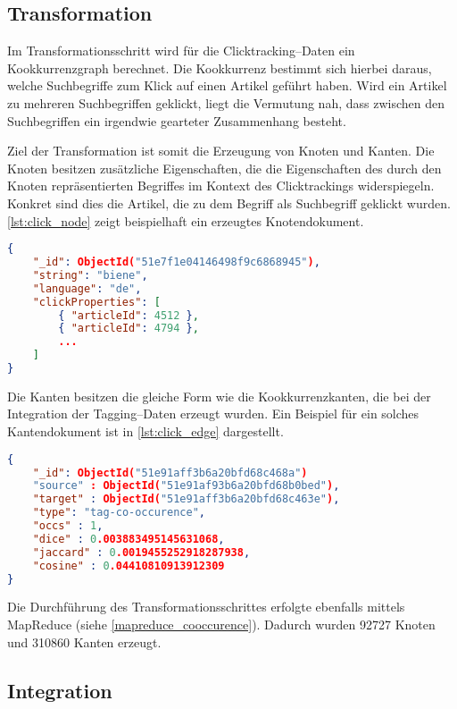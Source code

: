 \subsection{Transformation}

Im Transformationsschritt wird für die Clicktracking--Daten ein Kookkurrenzgraph berechnet. Die Kookkurrenz bestimmt sich hierbei daraus, welche Suchbegriffe zum Klick auf einen Artikel geführt haben. Wird ein Artikel zu mehreren Suchbegriffen geklickt, liegt die Vermutung nah, dass zwischen den Suchbegriffen ein irgendwie gearteter Zusammenhang besteht.

Ziel der Transformation ist somit die Erzeugung von Knoten und Kanten. Die Knoten besitzen zusätzliche Eigenschaften, die die Eigenschaften des durch den Knoten repräsentierten Begriffes im Kontext des Clicktrackings widerspiegeln. Konkret sind dies die Artikel, die zu dem Begriff als Suchbegriff geklickt wurden. \cref{lst:click_node} zeigt beispielhaft ein erzeugtes Knotendokument.

\begin{lstlisting}[language=json, label={lst:click_node}, caption={Knotendokument mit Clicktracking--Eigenschaften}]
{
    "_id": ObjectId("51e7f1e04146498f9c6868945"),
    "string": "biene",
    "language": "de",
    "clickProperties": [
        { "articleId": 4512 },
        { "articleId": 4794 },
        ...
    ]
}
\end{lstlisting}

Die Kanten besitzen die gleiche Form wie die Kookkurrenzkanten, die bei der Integration der Tagging--Daten erzeugt wurden. Ein Beispiel für ein solches Kantendokument ist in \cref{lst:click_edge} dargestellt.

\begin{lstlisting}[language=json, label={lst:click_edge}, caption={Clicktracking--Kookkurrenzkante}]
{
    "_id": ObjectId("51e91aff3b6a20bfd68c468a")
    "source" : ObjectId("51e91af93b6a20bfd68b0bed"),
    "target" : ObjectId("51e91aff3b6a20bfd68c463e"),
    "type": "tag-co-occurence",
    "occs" : 1,
    "dice" : 0.003883495145631068,
    "jaccard" : 0.0019455252918287938,
    "cosine" : 0.04410810913912309
}
\end{lstlisting}

Die Durchführung des Transformationsschrittes erfolgte ebenfalls mittels MapReduce (siehe \cref{mapreduce_cooccurence}). Dadurch wurden \num{92727} Knoten und \num{310860} Kanten erzeugt.

\subsection{Integration}
\label{click_integration}


